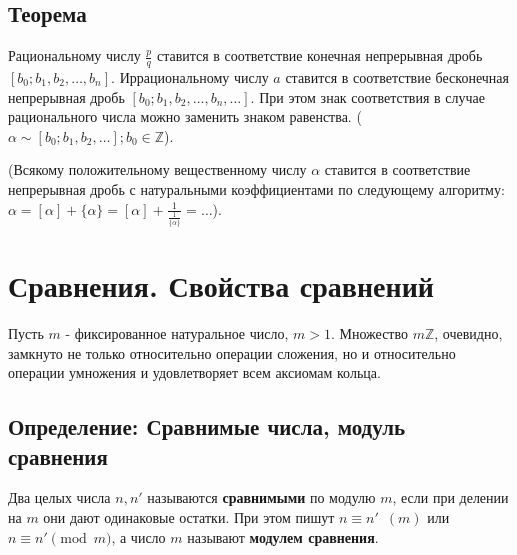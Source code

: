 \documentclass{article}
\begin{document}
\subsection{Теорема}
Рациональному числу $\frac{p}{q}$ ставится в соответствие конечная непрерывная дробь $[b_0; b_1, b_2, \dots, b_n]$. Иррациональному числу $a$ ставится в соответствие бесконечная непрерывная дробь $[b_0; b_1, b_2, \dots, b_n, \dots]$. При этом знак соответствия в случае рационального числа можно заменить знаком равенства. ($\alpha \sim [b_0; b_1, b_2, \dots]; b_0 \in \mathbb Z$).

(Всякому положительному вещественному числу $\alpha$ ставится в соответствие непрерывная дробь с натуральными коэффициентами по следующему алгоритму: $\alpha = [\alpha] + \{\alpha\} = [\alpha] + \frac{1}{\frac{1}{\{\alpha\}}} = \dots$).


\newpage
\section{Сравнения. Свойства сравнений}
Пусть $m$ - фиксированное натуральное число, $m > 1$. Множество $m \mathbb Z$, очевидно, замкнуто не только относительно операции сложения, но и относительно операции умножения и удовлетворяет всем аксиомам кольца.
\subsection{Определение: Сравнимые числа, модуль сравнения}
Два целых числа $n, n'$ называются \textbf{сравнимыми} по модулю $m$, если при делении на $m$ они дают одинаковые остатки. При этом пишут $n \equiv n' \enspace (m)$ или $n \equiv n' \pmod{m}$, а число $m$ называют \textbf{модулем сравнения}.
\end{document}
